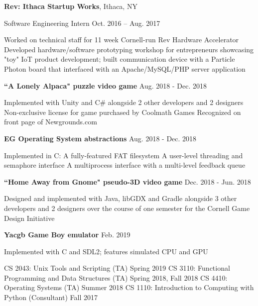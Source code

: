 \documentclass[letterpaper,MMMyyyy,nonstopmode]{simpleresumecv}
\begin{document}
\begin{Body}
\Gap

\Entry
\textbf{Rev: Ithaca Startup Works},
Ithaca, NY

\Gap
\BulletItem
Software Engineering Intern
\hfill
Oct. 2016 -- Aug. 2017
\begin{Detail}
\SubBulletItem
Worked on technical staff for 11 week Cornell-run Rev Hardware Accelerator
\SubBulletItem
Developed hardware/software prototyping workshop for entrepreneurs showcasing \newline "toy" IoT product development; built communication device with a Particle Photon \newline board that interfaced with an Apache/MySQL/PHP server application
\end{Detail}

\BulletItem
\textbf{``A Lonely Alpaca" puzzle video game}
\hfill
Aug. 2018 - Dec. 2018
\begin{Detail}
\Item
Implemented with Unity and C\# alongside 2 other developers and 2 designers
\SubBulletItem Non-exclusive license for game purchased by Coolmath Games
\SubBulletItem Recognized on front page of Newgrounds.com
\end{Detail}


\Gap
\BulletItem
\textbf{EG Operating System abstractions}
\hfill
Aug. 2018 - Dec. 2018
\begin{Detail}
\Item
Implemented in C:
\SubBulletItem A fully-featured FAT filesystem
\SubBulletItem A user-level threading and semaphore interface
\SubBulletItem A multiprocess interface with a multi-level feedback queue
\end{Detail}

\Gap

\BulletItem
\textbf{``Home Away from Gnome" pseudo-3D video game}
\hfill
Dec. 2018 - Jun. 2018
\begin{Detail}
\Item
Designed and implemented with Java, libGDX and Gradle alongside 3 other developers \newline and 2 designers over the course of one semester for the Cornell Game Design Initiative
\end{Detail}

\Gap
\BulletItem
\textbf{Yacgb Game Boy emulator}
\hfill
Feb. 2019
\begin{Detail}
\Item
Implemented with C and SDL2; features simulated CPU and GPU
\end{Detail}


\BulletItem CS 2043: Unix Tools and Scripting (TA) \hfill Spring 2019
\BulletItem CS 3110: Functional Programming and Data Structures (TA) \hfill Spring 2018, Fall 2018
\BulletItem CS 4410: Operating Systems (TA) \hfill Summer 2018
\BulletItem CS 1110: Introduction to Computing with Python (Consultant) \hfill Fall 2017


\end{Body}
\end{document}
